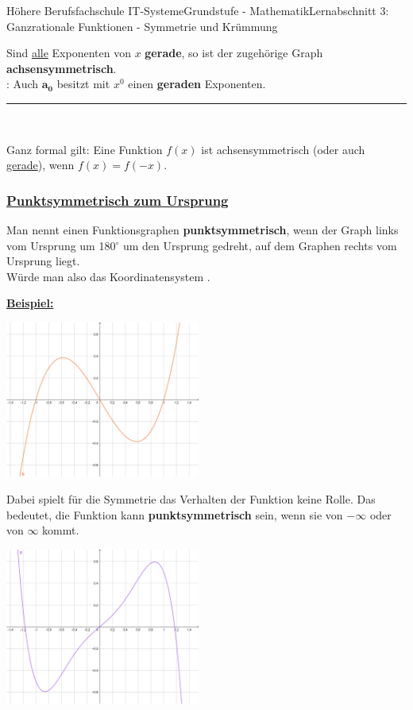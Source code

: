 \documentclass[11pt,twocolumn,oneside,openany,headings=optiontotoc,11pt,numbers=noenddot]{article}
\begin{document}
\begin{worksheet}{Höhere Berufsfachschule IT-Systeme}{Grundstufe - Mathematik}{Lernabschnitt 3: Ganzrationale Funktionen - Symmetrie und Krümmung}
\begin{framed}
			\noindent
			Sind \underline{alle} Exponenten von \(x\) \textbf{gerade}, so ist der zugehörige Graph \textbf{achsensymmetrisch}.\\
			\normalcolor{}: Auch \(\mathbf{a_0}\) besitzt mit \(x^0\) einen \textbf{geraden} Exponenten.\\
			\par\noindent
			\rule{\textwidth}{0.1pt}\\
			\par\noindent
			Ganz formal gilt: Eine Funktion \(f(x)\) ist achsensymmetrisch (oder auch \underline{gerade}), wenn \(f(x) = f(-x)\).
		\end{framed}
		\subsubsection{\underline{Punktsymmetrisch zum Ursprung}}
		Man nennt einen Funktionsgraphen \textbf{punktsymmetrisch}, wenn  der Graph links vom Ursprung um 180\(^{\circ}\) um den Ursprung gedreht, auf dem Graphen rechts vom Ursprung liegt.\\
		Würde man also das Koordinatensystem .\\
		\par\noindent
		\underline{\textbf{Beispiel:}}\\
		\par\noindent
		\includegraphics[width=0.48\textwidth]{../99_Bilder/psymm.jpg}\\
		\par\noindent
		Dabei spielt für die Symmetrie das Verhalten der Funktion keine Rolle. Das bedeutet, die Funktion kann \textbf{punktsymmetrisch} sein, wenn sie von \(-\infty\) oder von \(\infty\) kommt.\\
		\par\noindent
		\includegraphics[width=0.48\textwidth]{../99_Bilder/psymm_2.jpg}\\

\end{worksheet}
\end{document}
